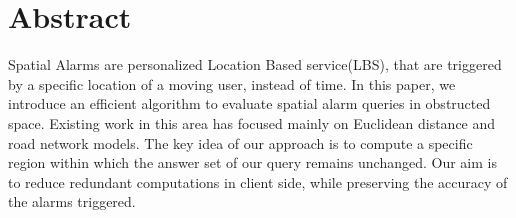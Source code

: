 \chapter*{Abstract}

\hspace{3ex} Spatial Alarms are personalized Location Based service(LBS), that are triggered by a specific location of a moving user, instead of time. In this paper, we introduce an efficient algorithm to evaluate spatial alarm queries in obstructed space. Existing work in this area has focused mainly on Euclidean distance and road network models. The key idea of our approach is to compute a specific region within which the answer set of our query remains unchanged. Our aim is to reduce redundant computations in client side, while preserving the accuracy of the alarms triggered.

